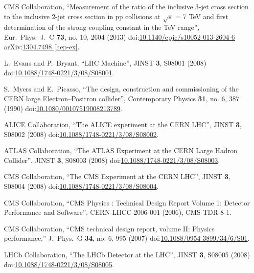 \begin{thebibliography}{99}

CMS Collaboration, ``Measurement of the ratio of the inclusive 3-jet cross section to the inclusive 2-jet cross section in pp collisions at $\sqrt{s}$ = 7 TeV and first determination of the strong coupling constant in the TeV range'', Eur.\ Phys.\ J.\ C {\bf 73}, no. 10, 2604 (2013) doi:\href{http://dx.doi.org/10.1140/epjc/s10052-013-2604-6}{10.1140/epjc/s10052-013-2604-6} arXiv:\href{https://arxiv.org/abs/1304.7498}{1304.7498 [hep-ex]}.



L.~Evans and P.~Bryant, ``LHC Machine'', JINST {\bf 3}, S08001 (2008) doi:\href{http://dx.doi.org/10.1088/1748-0221/3/08/S08001}{10.1088/1748-0221/3/08/S08001}.
  
S.~Myers and E.~Picasso, ``The design, construction and commissioning of the CERN large Electron–Positron collider'', Contemporary Physics {\bf 31}, no. 6, 387 (1990) doi:\href{https://doi.org/10.1080/00107519008213789}{10.1080/00107519008213789}.

ALICE Collaboration, ``The ALICE experiment at the CERN LHC'', JINST {\bf 3}, S08002 (2008) doi:\href{http://dx.doi.org/10.1088/1748-0221/3/08/S08002}{10.1088/1748-0221/3/08/S08002}.

ATLAS Collaboration, ``The ATLAS Experiment at the CERN Large Hadron Collider'', JINST {\bf 3}, S08003 (2008) doi:\href{http://dx.doi.org/10.1088/1748-0221/3/08/S08003}{10.1088/1748-0221/3/08/S08003}.

CMS Collaboration, ``The CMS Experiment at the CERN LHC'', JINST {\bf 3}, S08004 (2008) doi:\href{http://dx.doi.org/10.1088/1748-0221/3/08/S08004}{10.1088/1748-0221/3/08/S08004}.
  
CMS Collaboration, ``CMS Physics : Technical Design Report Volume 1: Detector Performance and Software'', CERN-LHCC-2006-001 (2006), CMS-TDR-8-1. 

CMS Collaboration, ``CMS technical design report, volume II: Physics performance,'' J.\ Phys.\ G {\bf 34}, no. 6, 995 (2007) doi:\href{http://dx.doi.org/10.1088/0954-3899/34/6/S01}{10.1088/0954-3899/34/6/S01}.

LHCb Collaboration, ``The LHCb Detector at the LHC'', JINST {\bf 3}, S08005 (2008) doi:\href{http://dx.doi.org/10.1088/1748-0221/3/08/S08005}{10.1088/1748-0221/3/08/S08005}.


\end{thebibliography}

